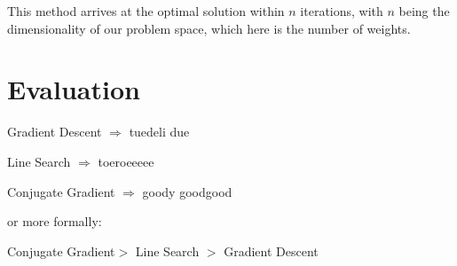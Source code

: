 \documentclass[a4paper,headings=small]{scrartcl}
\numberwithin{equation}{section} %
\numberwithin{figure}{section}   %
\begin{document}
This method arrives at the optimal solution within $n$ iterations,
with $n$ being the dimensionality of our problem space,
which here is the number of weights.


\newpage
\section{Evaluation}

\begin{list}{}{}
	\item Gradient Descent $\Rightarrow$ tuedeli due
	\item Line Search $\Rightarrow$ toeroeeeee
	\item Conjugate Gradient $\Rightarrow$ goody goodgood
\end{list}


or more formally:

Conjugate Gradient$ >$ Line Search $>$ Gradient Descent
\end{document}
